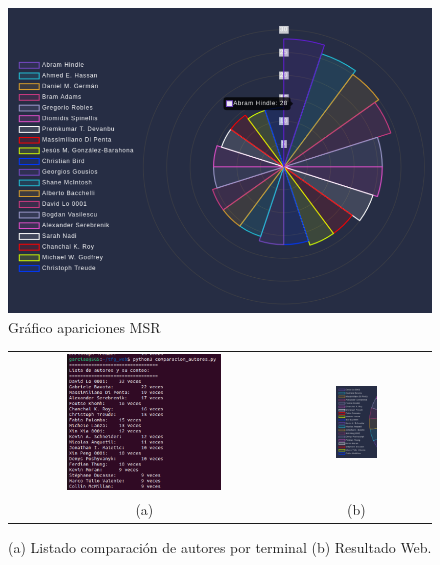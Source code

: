 \documentclass[a4paper, 12pt]{book}
\begin{document}
\begin{figure}[!h]
  \centering
  \includegraphics[width=14cm, keepaspectratio]{img/MSR_interactive.png}
  \caption{Gráfico apariciones MSR}
  \label{fig:msr_inter}
\end{figure}

\begin{figure}[!h]
    \centering
    \begin{tabular}{cc}
    \includegraphics[width=0.595\textwidth]{img/ICSME_list_count.png} &  
    \includegraphics[width=0.3\textwidth]{img/ICSME_list_l.png} \\
    (a) &(b)
    \end{tabular}
    \caption{(a) Listado comparación de autores por terminal (b) Resultado Web.}
    \label{fig:comp_ICSME}
\end{figure}
\end{document}
